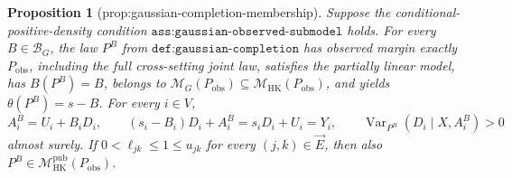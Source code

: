 \documentclass{article}
\newtheorem{proposition}{Proposition}
\begin{document}
\begin{proposition}[prop:gaussian-completion-membership]\label{prop:gaussian-completion-membership}
Suppose the conditional-positive-density condition \(\texttt{ass:gaussian-observed-submodel}\) holds.  For every \(B\in\mathcal B_G\), the law \(P^B\) from \(\texttt{def:gaussian-completion}\) has observed margin exactly \(P_{\mathrm{obs}}\), including the full cross-setting joint law, satisfies the partially linear model, has \(B(P^B)=B\), belongs to \(\mathcal M_G(P_{\mathrm{obs}})\subseteq\mathcal M_{\mathrm{HK}}(P_{\mathrm{obs}})\), and yields \(\theta(P^B)=s-B\).  For every \(i\in V\),
\[
A_i^B=U_i+B_iD_i,
\qquad
(s_i-B_i)D_i+A_i^B=s_iD_i+U_i=Y_i,
\qquad
\operatorname{Var}_{P^B}(D_i\mid X,A_i^B)>0
\]
almost surely.  If \(0<\ell_{jk}\le1\le u_{jk}\) for every \((j,k)\in\vec E\), then also \(P^B\in\mathcal M_{\mathrm{HK}}^{\mathrm{pub}}(P_{\mathrm{obs}})\).
\end{proposition}
\end{document}
